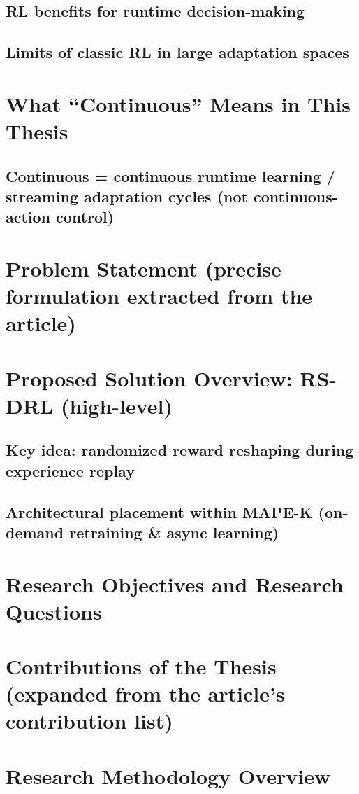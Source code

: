 \documentclass[11pt,a4paper]{article}
\begin{document}
\subsection{RL benefits for runtime decision-making}
\subsection{Limits of classic RL in large adaptation spaces}

\section{What ``Continuous'' Means in This Thesis}
\subsection{Continuous = continuous runtime learning / streaming adaptation cycles (not continuous-action control)}

\section{Problem Statement (precise formulation extracted from the article)}

\section{Proposed Solution Overview: RS-DRL (high-level)}
\subsection{Key idea: randomized reward reshaping during experience replay}
\subsection{Architectural placement within MAPE-K (on-demand retraining \& async learning)}

\section{Research Objectives and Research Questions}

\section{Contributions of the Thesis (expanded from the article's contribution list)}

\section{Research Methodology Overview}
\end{document}

